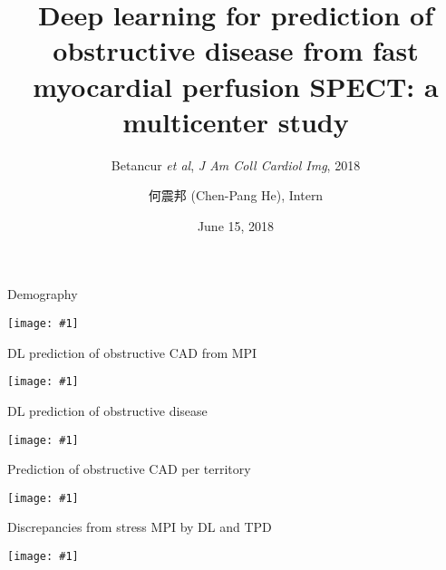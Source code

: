 \documentclass{beamer}
\title[Deep learning (Betancur \textit{et al}, 2018)]{Deep learning for prediction of obstructive disease from fast myocardial perfusion SPECT: a multicenter study}
\subtitle{Betancur \textit{et al}, \textit{J Am Coll Cardiol Img}, 2018}
\author[Chen-Pang He]{何震邦 (Chen-Pang He), Intern}
\date{June 15, 2018}
\institute[CGH]{Cathay General Hospital}
\newcommand*{\solo}[1]{\texttt{[image: \#1]}}
\begin{document}
\maketitle

\begin{frame}{Demography}
    \begin{center}
        \solo{0.eps}
    \end{center}
\end{frame}

\begin{frame}{DL prediction of obstructive CAD from MPI}
    \begin{center}
        \solo{1.eps}
    \end{center}
\end{frame}

\begin{frame}{DL prediction of obstructive disease}
    \begin{center}
        \solo{2.eps}
    \end{center}
\end{frame}

\begin{frame}{Prediction of obstructive CAD per territory}
    \begin{center}
        \solo{3.eps}
    \end{center}
\end{frame}

\begin{frame}{Discrepancies from stress MPI by DL and TPD}
    \begin{center}
        \solo{4.eps}
    \end{center}
\end{frame}
\end{document}
